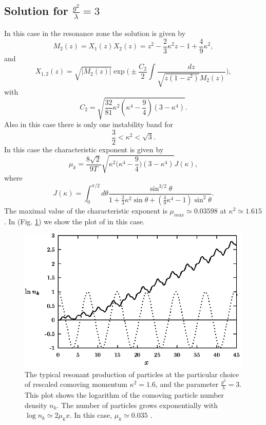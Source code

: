 \documentclass[11pt,a4paper,twoside]{book}
\begin{document}
\subsection*{Solution for $ \frac{g^{2}}{\lambda}=3 $}
In this case in the resonance zone the solution is given by
\begin{equation}
\label{Chap4:lambdaPhi4_MzsecondSolution}
M_{2}(z)=X_{1}(z)X_{2}(z)=z^{2}-\frac{2}{3}\kappa^{2}z-1+\frac{4}{9}\kappa^{2},
\end{equation}
and
\begin{equation}
	\label{Chap4:lambdaPhi4_ChiSolution2}
	X_{1,2}(z)=\sqrt{|M_{2}(z)|}\exp\Bigg(\pm \frac{C_{2}}{2}\int \frac{dz}{\sqrt{z(1-z^{2})} M_{2}(z)}\Bigg),
\end{equation}
with
\begin{equation}
\label{Chap4:lambdaPhi4_Csolution2}
C_{2}=\sqrt{\frac{32}{81}\kappa^{2}(\kappa^{4}-\frac{9}{4})(3-\kappa^{4})}.
\end{equation}
Also in this case there is only one instability band for 
\begin{equation}
\label{Chap4:lambdaPhi4_instabilityBandSolution2}
\frac{3}{2}<\kappa^{2}<\sqrt{3}.
\end{equation}
In this case the characteristic exponent is given by
\begin{equation}
\label{Chap4:lambdaPhi4_uksolution2}
\mu_{k}=\frac{8\sqrt{2}}{9T}\sqrt{\kappa^{2}\Bigg(\kappa^{4}-\frac{9}{4}\Bigg)(3-\kappa^{4})} J(\kappa),
\end{equation}
where
\begin{equation}
\label{Chap4:lambdaPhi4_Jk}
J(\kappa) = \int_{0}^{\pi/2}d \theta \frac{\sin^{3/2} \theta}{1+\frac{2}{3}\kappa^{2}\sin \theta + (\frac{4}{9}\kappa^{4}-1)\sin^{2}\theta}.
\end{equation}
The maximal value of the characteristic exponent is $ \mu_{max}\simeq 0.03598 $ at $ \kappa^{2}\simeq 1.615 $. In (Fig. \ref{fig:conformaltheoryfig3}) we show the plot of \cite{Chap4:ModelLambdaPhi4Reference} in this case.
\begin{figure}
	\centering
	\includegraphics[width=0.6\linewidth, height=0.3\textheight]{Images/Chap4/ConformalTheory_Fig3}
	\caption{The typical resonant production of particles at the particular choice of rescaled comoving momentum $ \kappa^{2}=1.6 $, and the parameter $ \frac{g^{2}}{\lambda}=3 $. This plot shows the logarithm of the comoving particle number density $ n_{k} $. The number of particles grows exponentially with $ \log n_{k} \simeq 2\mu_{k}x$. In this case, $\mu_{k}\simeq 0.035 $ \cite{Chap4:ModelLambdaPhi4Reference}.}
	\label{fig:conformaltheoryfig3}
\end{figure}
\end{document}
